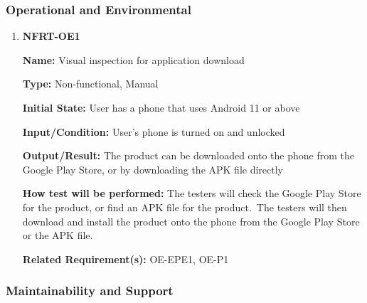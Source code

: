 \documentclass[12pt, titlepage]{article}
\begin{document}
\subsubsection{Operational and Environmental}

\begin{enumerate}
\item{\textbf{NFRT-OE1}}

\textbf{Name:} Visual inspection for application download

\textbf{Type:} Non-functional, Manual

\textbf{Initial State:} User has a phone that uses Android 11 or above

\textbf{Input/Condition:} User's phone is turned on and unlocked

\textbf{Output/Result:} The product can be downloaded onto the phone from the Google Play Store, or by downloading the APK file directly

\textbf{How test will be performed:} The testers will check the Google Play Store for the product, or find an APK file for the product.\
The testers will then download and install the product onto the phone from the Google Play Store or the APK file.

\textbf{Related Requirement(s):} OE-EPE1, OE-P1
\end{enumerate}

\subsubsection{Maintainability and Support}
\end{document}
